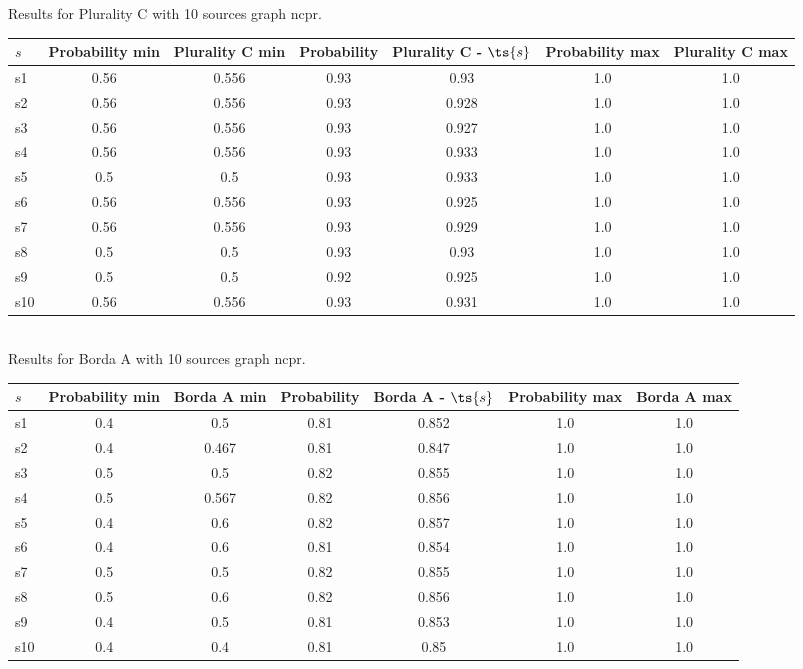 \documentclass{article}
\begin{document}
\noindent Results for Plurality C with 10 sources graph ncpr.

\noindent\begin{tabular}{|l|c|c|c|c|c|c|}
\hline
$s$& Probability min & Plurality C min & Probability & Plurality C - $\ts{s}$ & Probability max & Plurality C max\\
\hline
s1 &0.56 & 0.556 & 0.93 & 0.93 & 1.0 & 1.0\\
\hline
s2 &0.56 & 0.556 & 0.93 & 0.928 & 1.0 & 1.0\\
\hline
s3 &0.56 & 0.556 & 0.93 & 0.927 & 1.0 & 1.0\\
\hline
s4 &0.56 & 0.556 & 0.93 & 0.933 & 1.0 & 1.0\\
\hline
s5 &0.5 & 0.5 & 0.93 & 0.933 & 1.0 & 1.0\\
\hline
s6 &0.56 & 0.556 & 0.93 & 0.925 & 1.0 & 1.0\\
\hline
s7 &0.56 & 0.556 & 0.93 & 0.929 & 1.0 & 1.0\\
\hline
s8 &0.5 & 0.5 & 0.93 & 0.93 & 1.0 & 1.0\\
\hline
s9 &0.5 & 0.5 & 0.92 & 0.925 & 1.0 & 1.0\\
\hline
s10 &0.56 & 0.556 & 0.93 & 0.931 & 1.0 & 1.0\\
\hline
\end{tabular}\\

\noindent Results for Borda A with 10 sources graph ncpr.

\noindent\begin{tabular}{|l|c|c|c|c|c|c|}
\hline
$s$& Probability min & Borda A min & Probability & Borda A - $\ts{s}$ & Probability max & Borda A max\\
\hline
s1 &0.4 & 0.5 & 0.81 & 0.852 & 1.0 & 1.0\\
\hline
s2 &0.4 & 0.467 & 0.81 & 0.847 & 1.0 & 1.0\\
\hline
s3 &0.5 & 0.5 & 0.82 & 0.855 & 1.0 & 1.0\\
\hline
s4 &0.5 & 0.567 & 0.82 & 0.856 & 1.0 & 1.0\\
\hline
s5 &0.4 & 0.6 & 0.82 & 0.857 & 1.0 & 1.0\\
\hline
s6 &0.4 & 0.6 & 0.81 & 0.854 & 1.0 & 1.0\\
\hline
s7 &0.5 & 0.5 & 0.82 & 0.855 & 1.0 & 1.0\\
\hline
s8 &0.5 & 0.6 & 0.82 & 0.856 & 1.0 & 1.0\\
\hline
s9 &0.4 & 0.5 & 0.81 & 0.853 & 1.0 & 1.0\\
\hline
s10 &0.4 & 0.4 & 0.81 & 0.85 & 1.0 & 1.0\\
\hline
\end{tabular}\\
\end{document}

